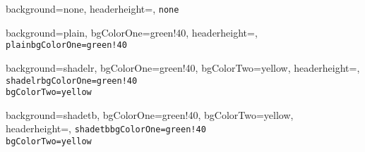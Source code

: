 \documentclass[portrait,fontscale=0.7,margin=0.2cm,paperwidth=8.2truecm, paperheight=11.88truecm,debug]{baposter}
\begin{document}
\begin{poster}{
  background=none,
  headerheight=\textheight,
}{}{\texttt{none}}{}{}

\end{poster}

\begin{poster}{
  background=plain,
  bgColorOne=green!40,
  headerheight=\textheight,
}{}{\texttt{plain}}{\texttt{bgColorOne=green!40}}{}

\end{poster}

\begin{poster}{
  background=shadelr,
  bgColorOne=green!40,
  bgColorTwo=yellow,
  headerheight=\textheight,
}{}{\texttt{shadelr}}{\texttt{bgColorOne=green!40}\\
\texttt{bgColorTwo=yellow}}{}

\end{poster}

\begin{poster}{
  background=shadetb,
  bgColorOne=green!40,
  bgColorTwo=yellow,
  headerheight=\textheight,
}{}{\texttt{shadetb}}{\texttt{bgColorOne=green!40}\\
\texttt{bgColorTwo=yellow}}{}
\end{poster}
\end{document}
